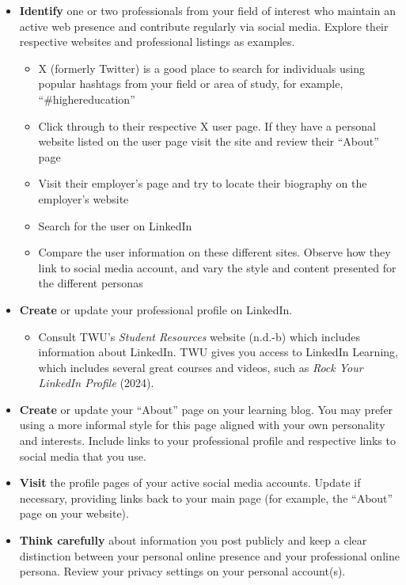 \documentclass[
  letterpaper,
  DIV=11,
  numbers=noendperiod]{scrreprt}
\providecommand{\tightlist}{%
  \setlength{\itemsep}{0pt}\setlength{\parskip}{0pt}}\usepackage{longtable,booktabs,array}
\begin{document}
\begin{tcolorbox}
\begin{itemize}
\tightlist
\item
  \textbf{Identify} one or two professionals from your field of interest
  who maintain an active web presence and contribute regularly via
  social media. Explore their respective websites and professional
  listings as examples.

  \begin{itemize}
  \tightlist
  \item
    X (formerly Twitter) is a good place to search for individuals using
    popular hashtags from your field or area of study, for example,
    ``\#highereducation''
  \item
    Click through to their respective X user page. If they have a
    personal website listed on the user page visit the site and review
    their ``About'' page
  \item
    Visit their employer's page and try to locate their biography on the
    employer's website
  \item
    Search for the user on LinkedIn
  \item
    Compare the user information on these different sites. Observe how
    they link to social media account, and vary the style and content
    presented for the different personas
  \end{itemize}
\item
  \textbf{Create} or update your professional profile on LinkedIn.

  \begin{itemize}
  \tightlist
  \item
    Consult TWU's \emph{Student Resources} website (n.d.-b) which
    includes information about LinkedIn. TWU gives you access to
    LinkedIn Learning, which includes several great courses and videos,
    such as \emph{Rock Your LinkedIn Profile} (2024).
  \end{itemize}
\item
  \textbf{Create} or update your ``About'' page on your learning blog.
  You may prefer using a more informal style for this page aligned with
  your own personality and interests. Include links to your professional
  profile and respective links to social media that you use.
\item
  \textbf{Visit} the profile pages of your active social media accounts.
  Update if necessary, providing links back to your main page (for
  example, the ``About'' page on your website).
\item
  \textbf{Think carefully} about information you post publicly and keep
  a clear distinction between your personal online presence and your
  professional online persona. Review your privacy settings on your
  personal account(s).
\end{itemize}

\end{tcolorbox}
\end{document}
